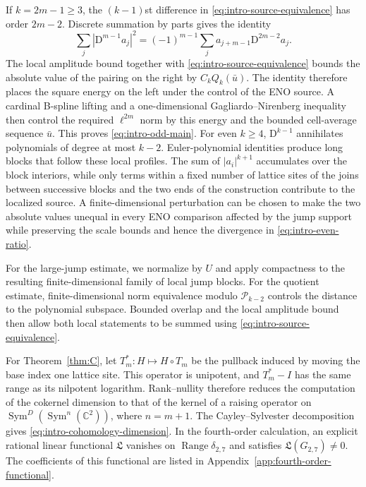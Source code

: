 \documentclass[11pt]{amsart}
\theoremstyle{plain}
\theoremstyle{definition}
\theoremstyle{remark}
\numberwithin{equation}{section}
\theoremstyle{plain}
\begin{document}
If $k=2m-1\ge3$, the $(k-1)$st difference in
\eqref{eq:intro-source-equivalence} has order $2m-2$.  Discrete summation by parts
gives the identity
\[
	\sum_j|\mathrm D^{m-1}a_j|^2
	=(-1)^{m-1}\sum_j a_{j+m-1}\mathrm D^{2m-2}a_j.
\]
The local amplitude bound together with
\eqref{eq:intro-source-equivalence} bounds the absolute value of the pairing
on the right by $C_kQ_k(\bar u)$.  The identity therefore places the square
energy on the left under the control of the ENO source.
A cardinal B-spline lifting and a
one-dimensional Gagliardo--Nirenberg inequality then control the required
$\ell^{2m}$ norm by this energy and the bounded cell-average sequence
$\bar u$.  This proves \eqref{eq:intro-odd-main}.  For even $k\ge4$,
$\mathrm D^{k-1}$ annihilates polynomials of degree at most $k-2$.
Euler-polynomial identities produce long blocks that follow these local
profiles.  The sum of $|a_i|^{k+1}$ accumulates over the block interiors,
while only terms within a fixed number of lattice sites of the joins between
successive blocks and the two ends of the construction contribute to the
localized source.  A finite-dimensional perturbation can be chosen to make
the two absolute values unequal in every ENO comparison affected by the
jump support while preserving the scale
bounds and hence the divergence in \eqref{eq:intro-even-ratio}.

For the large-jump estimate, we normalize by $U$ and apply compactness to the
resulting finite-dimensional family of local jump blocks.  For the quotient
estimate, finite-dimensional norm equivalence modulo $\mathcal P_{k-2}$
controls the distance to the polynomial
subspace.  Bounded overlap and the local amplitude bound then allow both local
statements to be summed using \eqref{eq:intro-source-equivalence}.

For Theorem~\ref{thm:C}, let $T_m^*:H\mapsto H\circ T_m$ be the pullback
induced by moving the base index one lattice site.  This operator is
unipotent, and $T_m^*-I$ has the same range as its nilpotent logarithm.
Rank--nullity therefore reduces the computation of the cokernel dimension to
that of the kernel of a raising operator on
$\operatorname{Sym}^D(\operatorname{Sym}^n(\mathbb C^2))$, where $n=m+1$.
The Cayley--Sylvester decomposition \cite{CayleySecondQuantics} gives
\eqref{eq:intro-cohomology-dimension}.  In the
fourth-order calculation, an explicit rational linear functional $\mathfrak L$
vanishes on $\operatorname{Range}\delta_{2,7}$ and satisfies
$\mathfrak L(G_{2,7})\ne0$.  The coefficients of this functional are listed in
Appendix~\ref{app:fourth-order-functional}.
\end{document}

